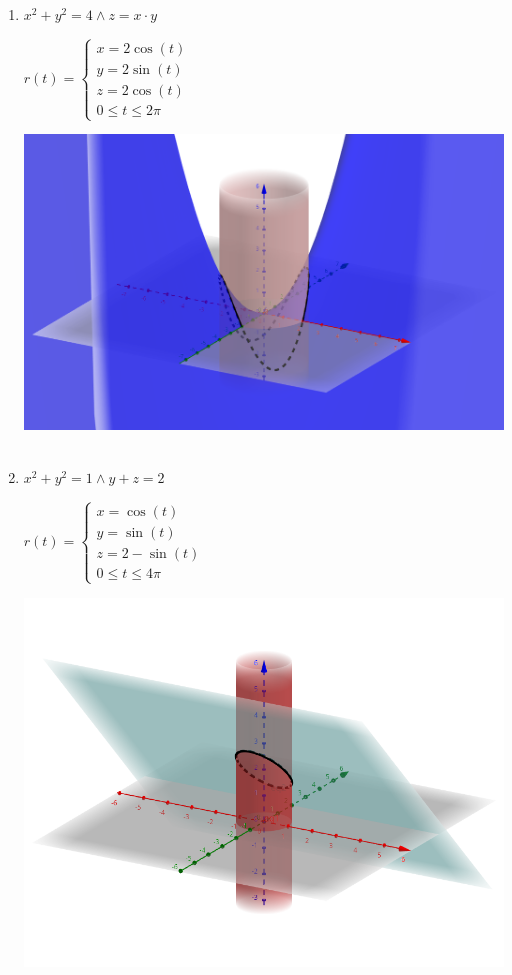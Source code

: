 \documentclass[../practica_02.tex]{subfiles}
\begin{document}
    \begin{enumerate}
        \item $x^2 + y^2 = 4 \wedge z = x \cdot y$

        \quad $ r(t) = \left\{
            \begin{array}{ll}
                x = 2\cos(t) \\
                y = 2\sin(t) \\
                z = 2\cos(t) \\
                0 \leq t \leq 2\pi
            \end{array}
            \right.$

            \includegraphics[scale=0.4]{ej12/resources/1a.png} $ $

        \item $ x^2 + y^2 = 1 \wedge y + z = 2$

            \quad $ r(t) = \left\{
                \begin{array}{ll}
                    x = \cos(t) \\
                    y = \sin(t) \\
                    z = 2 - \sin(t) \\
                    0 \leq t \leq 4\pi
                \end{array}
                \right.$

            \includegraphics[scale=0.4]{ej12/resources/1b.png} $ $


\end{enumerate}
\end{document}
